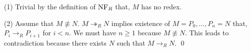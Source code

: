 \begin{pf} \rm
(1) Trivial by the definition of $\mathrm{NF}_R$ that, $M$ has no redex.

\noindent (2) Assume that $M\not\equiv N$. $M\twoheadrightarrow_R N$ implies
existence of $M=P_0,\ldots,P_n=N$ that, $P_i\to_R P_{i+1}$ for $i<n$.
We must have $n\geq 1$ because $M\not\equiv N$. This leads to contradiction
because there exists $N$ such that $M\to_R N$. \qed
\end{pf}
